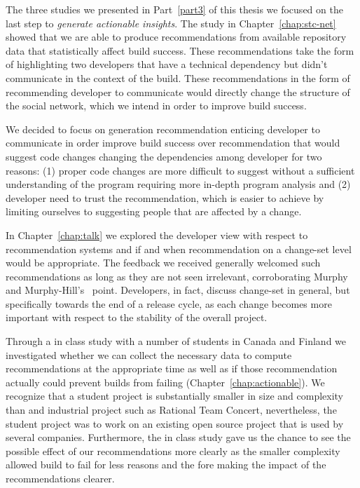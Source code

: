 The three studies we presented in Part~\ref{part3} of this thesis we  focused on the last step to \emph{generate actionable insights}.
The study in Chapter~\ref{chap:stc-net} showed that we are able to produce recommendations from available repository data that statistically affect build success.
These recommendations take the form of highlighting two developers that have a technical dependency but didn't communicate in the context of the build.
These recommendations in the form of recommending developer to communicate would directly change the structure of the social network, which we intend in order to improve build success.

We decided to focus on generation recommendation enticing developer to communicate in order improve build success over recommendation that would suggest code changes changing the dependencies among developer for two reasons:
(1) proper code changes are more difficult to suggest without a sufficient understanding of the program requiring more in-depth program analysis and 
(2) developer need to trust the recommendation, which is easier to achieve by limiting ourselves to suggesting people that are affected by a change.

In Chapter~\ref{chap:talk} we explored the developer view with respect to recommendation systems and if and when recommendation on a change-set level would be appropriate.
The feedback we received generally welcomed such recommendations as long as they are not seen irrelevant, corroborating Murphy and Murphy-Hill's~\cite{murphy:rsse:2010} point.
Developers, in fact, discuss change-set in general, but specifically towards the end of a release cycle, as each change becomes more important with respect to the stability of the overall project.

Through a in class study with a number of students in Canada and Finland we investigated whether we can collect the necessary data to compute recommendations at the appropriate time as well as if those recommendation actually could prevent builds from failing (Chapter~\ref{chap:actionable}).
We recognize that a student project is substantially smaller in size and complexity than and industrial project such as Rational Team Concert, nevertheless, the student project was to work on an existing open source project that is used by several companies.
Furthermore, the in class study gave us the chance to see the possible effect of our recommendations more clearly as the smaller complexity allowed build to fail for less reasons and the fore making the impact of the recommendations clearer.

